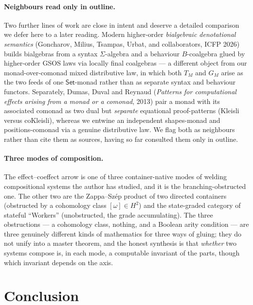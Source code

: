 \documentclass[11pt]{amsart}
\theoremstyle{plain}
\theoremstyle{definition}
\theoremstyle{remark}
\newcommand{\Set}{\mathsf{Set}}
\begin{document}
\paragraph{Neighbours read only in outline.}
Two further lines of work are close in intent and deserve a detailed comparison we defer here
to a later reading. Modern higher-order \emph{bialgebraic denotational semantics} (Goncharov,
Milius, Tsampas, Urbat, and collaborators, ICFP 2026) builds bialgebras from a syntax
$\Sigma$-algebra and a behaviour $B$-coalgebra glued by higher-order GSOS laws via locally
final coalgebras --- a different object from our monad-over-comonad mixed distributive law, in
which both $T_M$ and $G_M$ arise as the two feeds of one $\Set$-monad rather than as separate
syntax and behaviour functors. Separately, Dumas, Duval and Reynaud (\emph{Patterns for
computational effects arising from a monad or a comonad}, 2013) pair a monad with its
associated comonad as two dual but \emph{separate} equational proof-patterns (Kleisli versus
coKleisli), whereas we entwine an independent shapes-monad and positions-comonad via a genuine
distributive law. We flag both as neighbours rather than cite them as sources, having so far
consulted them only in outline.

\paragraph{Three modes of composition.}
The effect--coeffect arrow is one of three container-native modes of welding compositional
systems the author has studied, and it is the branching-obstructed one. The other two are the
Zappa--Sz\'ep product of two directed containers (obstructed by a cohomology class
$[\omega]\in H^2$) and the state-graded category of stateful ``Workers'' (unobstructed, the
grade accumulating). The three obstructions --- a cohomology class, nothing, and a Boolean
arity condition --- are three genuinely different kinds of mathematics for three ways of
gluing; they do not unify into a master theorem, and the honest synthesis is that
\emph{whether} two systems compose is, in each mode, a computable invariant of the parts,
though which invariant depends on the axis.

\section{Conclusion}\label{sec:conclusion}
\end{document}
